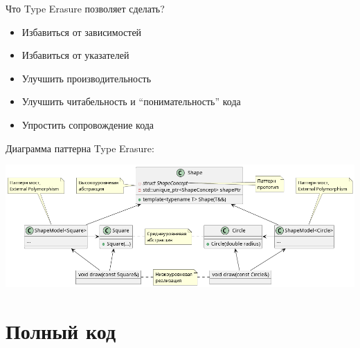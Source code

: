 \documentclass[14pt,a4paper]{article}
\providecommand{\tightlist}{%
	\setlength{\itemsep}{0pt}\setlength{\parskip}{0pt}}
\begin{document}
Что Type Erasure позволяет сделать?

\begin{itemize}
\tightlist
\item
  Избавиться от зависимостей
\item
  Избавиться от указателей
\item
  Улучшить производительность
\item
  Улучшить читабельность и ``понимательность'' кода
\item
  Упростить сопровождение кода
\end{itemize}

Диаграмма паттерна Type Erasure:

\includegraphics{TE.png}

\hypertarget{ux43fux43eux43bux43dux44bux439-ux43aux43eux434}{%
\section{Полный
код}\label{ux43fux43eux43bux43dux44bux439-ux43aux43eux434}}
\end{document}
